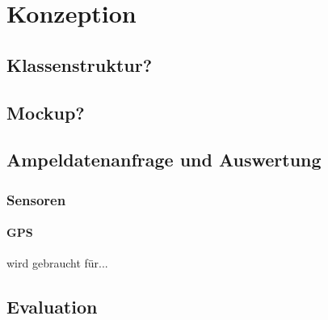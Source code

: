 \chapter{Konzeption}
\section{Klassenstruktur?}
\section{Mockup?}
\section{Ampeldatenanfrage und Auswertung}
\subsection{Sensoren}
\subsubsection{GPS} wird gebraucht für...
\section{Evaluation}
